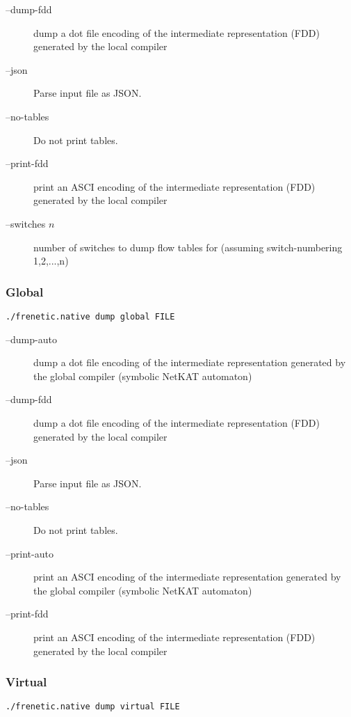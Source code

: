 \begin{description}
\item[--dump-fdd]    dump a dot file encoding of the intermediate representation
                  (FDD) generated by the local compiler
\item[--json]        Parse input file as JSON.
\item[--no-tables]   Do not print tables.
\item[--print-fdd]   print an ASCI encoding of the intermediate representation
                  (FDD) generated by the local compiler
\item[--switches $n$]  number of switches to dump flow tables for (assuming
                  switch-numbering 1,2,...,n)
\end{description}

\subsubsection{Global}

\begin{verbatim}
./frenetic.native dump global FILE
\end{verbatim}

\begin{description}
\item[--dump-auto]   dump a dot file encoding of the intermediate representation
                  generated by the global compiler (symbolic NetKAT automaton)
\item[--dump-fdd]    dump a dot file encoding of the intermediate representation
                  (FDD) generated by the local compiler
\item[--json]        Parse input file as JSON.
\item[--no-tables]   Do not print tables.
\item[--print-auto]  print an ASCI encoding of the intermediate representation
                  generated by the global compiler (symbolic NetKAT automaton)
\item[--print-fdd]   print an ASCI encoding of the intermediate representation
                  (FDD) generated by the local compiler
\end{description}

\subsubsection{Virtual}

\begin{verbatim}
./frenetic.native dump virtual FILE
\end{verbatim}

